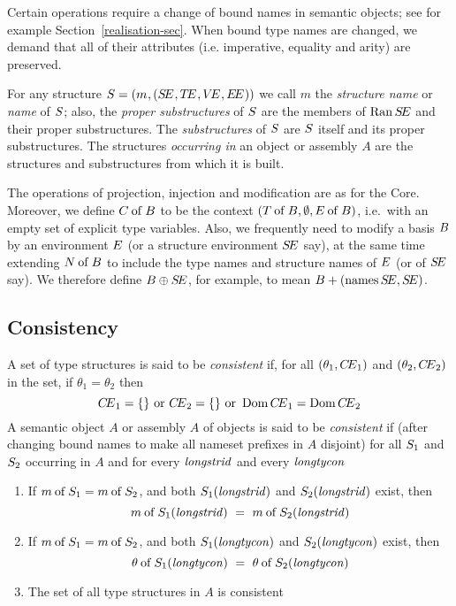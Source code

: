 
Certain operations require a change of bound names in semantic objects;
see for example Section~\ref{realisation-sec}. When bound type names are
changed, we demand that all of their attributes (i.e. imperative, equality
and arity) are preserved.

For any structure $\S=\longS{}$ we call $m$ the {\sl structure name} or
{\sl name} of $\S$; also, the {\sl proper substructures} of $\S$ are
the members of $\Ran\SE$ and their proper substructures.  The 
{\sl substructures} of
$\S$ are $\S$ itself and its proper substructures.  The structures
{\sl occurring in}
an object or assembly $A$ are the structures and
substructures from which it is built.

The operations of projection, injection and modification are as for the
Core. Moreover, we define $\of{\C}{\B}$ to be the context
$(\of{\T}{\B},\emptyset,\of{\E}{\B})$, i.e.~with an empty set of
explicit type variables.
Also,
we frequently need to modify a basis $\B$ by an environment $\E$
(or a structure environment $\SE$ say),
at the same time extending $\of{\N}{\B}$ to include the type names and
structure names of $\E$ (or of $\SE$ say).
We therefore define $\B\oplus\SE$, for example, to mean
$\B+(\NamesFcn\SE,\SE)$.

\subsection{Consistency}
\label{consistency-sec}
A set of type structures is said to be {\sl consistent} if, for all
$(\theta_1,\CE_1)$ and $(\theta_2,\CE_2)$ in the set, if $\theta_1 = \theta_2$
then
\[\CE_1=\emptymap\ {\rm or}\ \CE_2=\emptymap\ {\rm or}\ \Dom\CE_1=\Dom\CE_2\]
A semantic object $A$ or assembly $A$ of objects is said to be
{\sl consistent} if (after changing bound names to make all nameset prefixes
in $A$ disjoint) for all $\S_1$ and
$\S_2$ occurring in $A$ and for every $\longstrid$ and every $\longtycon$
\begin{enumerate}
\item If $\of{\m}{\S_1}=\of{\m}{\S_2}$, and both
      $\S_1(\longstrid)$ and $\S_2(\longstrid)$ exist, then
      \[ \of{\m}{\S_1(\longstrid)}\ =\ \of{\m}{\S_2(\longstrid)}\]
\item If $\of{\m}{\S_1}=\of{\m}{\S_2}$, and both
      $\S_1(\longtycon)$ and $\S_2(\longtycon)$ exist, then
      \[ \of{\theta}{\S_1(\longtycon)}\ =\ \of{\theta}{\S_2(\longtycon)}\]
\item The set of all type structures in $A$ is consistent
\end{enumerate}

